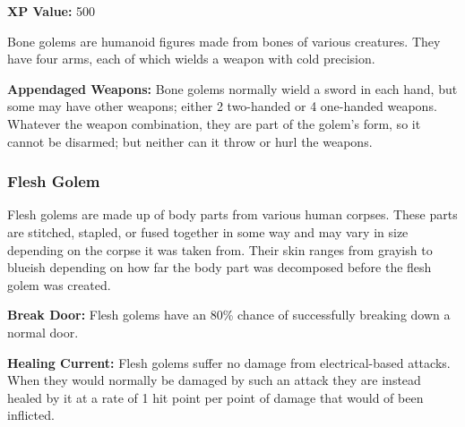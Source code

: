 \begin{multicols*}{2}
{\textbf{XP Value:} 500}

Bone golems are humanoid figures made from bones of various creatures. They have four arms, each of which wields a weapon with cold precision.

\textbf{Appendaged Weapons:} Bone golems normally wield a sword in each hand, but some may have other weapons; either 2 two-handed or 4 one-handed weapons. Whatever the weapon combination, they are part of the golem’s form, so it cannot be disarmed; but neither can it throw or hurl the weapons.

\subsubsection{Flesh Golem}

Flesh golems are made up of body parts from various human corpses. These parts are stitched, stapled, or fused together in some way and may vary in size depending on the corpse it was taken from. Their skin ranges from grayish to blueish depending on how far the body part was decomposed before the flesh golem was created.

\textbf{Break Door:} Flesh golems have an 80\% chance of successfully breaking down a normal door.

\textbf{Healing Current:} Flesh golems suffer no damage from electrical-based attacks. When they would normally be damaged by such an attack they are instead healed by it at a rate of 1 hit point per point of damage that would of been inflicted.


\end{multicols*}
